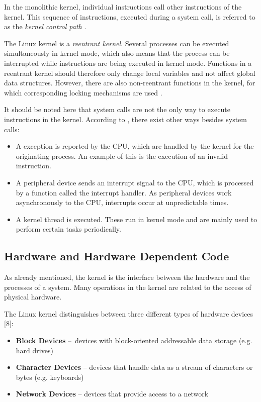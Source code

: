 In the monolithic kernel, individual instructions call other instructions of the kernel.  This sequence of instructions, executed during a system call, is referred to as the \textit{kernel control path} \cite{like07}.

The Linux kernel is a \textit{reentrant kernel}. Several processes can be executed simultaneously in kernel mode, which also means that the process can be interrupted while instructions are being executed in kernel mode. Functions in a reentrant kernel should therefore only change local variables and not affect global data structures. However, there are also non-reentrant functions in the kernel, for which corresponding locking mechanisms are used \cite{like02}.

It should be noted here that system calls are not the only way to execute instructions in the kernel. According to \cite{like02}, there exist other ways besides system calls:

\begin{itemize}
\item A exception is reported by the CPU, which are handled by the kernel for the originating process. An example of this is the execution of an invalid instruction.
\item A peripheral device sends an interrupt signal to the CPU, which is processed by a function called the interrupt handler. As peripheral devices work asynchronously to the CPU, interrupts occur at unpredictable times.
\item A kernel thread is executed. These run in kernel mode and are mainly used to perform certain tasks periodically.
\end{itemize}


\subsection{Hardware and Hardware Dependent Code} \label{chap:hwdependcode}

As already mentioned, the kernel is the interface between the hardware and the processes of a system. Many operations in the kernel are related to the access of physical hardware.

The Linux kernel distinguishes between three different types of hardware devices [8]:

\begin{itemize}
\item \textbf{Block Devices} – devices with block-oriented addressable data storage (e.g. hard drives)
\item \textbf{Character Devices} – devices that handle data as a stream of characters or bytes (e.g. keyboards)
\item \textbf{Network Devices} – devices that provide access to a network
\end{itemize}

